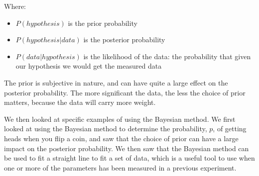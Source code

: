 Where:
\begin{itemize}
\item $P(hypothesis)$ is the prior probability
\item $P(hypothesis | data)$ is the posterior probability
\item $P(data|hypothesis)$ is the likelihood of the data: the probability that given our hypothesis we would get the measured data
\end{itemize}

The prior is subjective in nature, and can have quite a large effect on the posterior probability. The more significant the data, the less the choice of prior matters, because the data will carry more weight.

We then looked at specific examples of using the Bayesian method. We first looked at using the Bayesian method to determine the probability, $p$, of getting heads when you flip a coin, and saw that the choice of prior can have a large impact on the posterior probability. We then saw that the Bayesian method can be used to fit a straight line to fit a set of data, which is a useful tool to use when one or more of the parameters has been measured in a previous experiment.